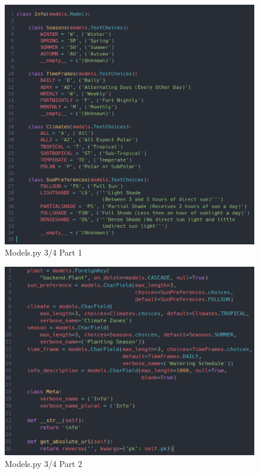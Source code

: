 \documentclass{article}
\begin{document}
    \begin{figure}
        \centering
        \caption{Models.py 3/4 Part 1}
        \includegraphics{models3-1}
    \end{figure}

    \begin{figure}
        \centering
        \caption{Models.py 3/4 Part 2}
        \includegraphics{models3-2}
    \end{figure}
    
\end{document}
